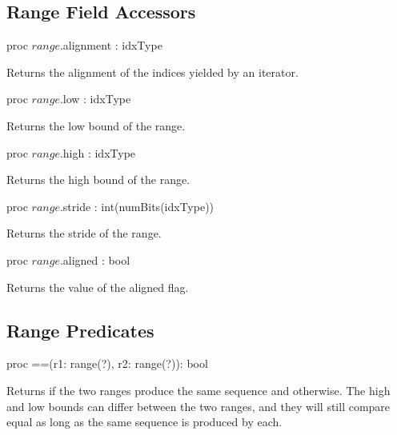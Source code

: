 \subsection{Range Field Accessors}
\label{Range_Field_Accessors}
\begin{protohead}
proc $range$.alignment : idxType
\end{protohead}
\begin{protobody}
Returns the alignment of the indices yielded by an iterator.  
\end{protobody}

\begin{protohead}
proc $range$.low : idxType
\end{protohead}
\begin{protobody}
Returns the low bound of the range.
\end{protobody}

\begin{protohead}
proc $range$.high : idxType
\end{protohead}
\begin{protobody}
Returns the high bound of the range.
\end{protobody}

\begin{protohead}
proc $range$.stride : int(numBits(idxType))
\end{protohead}
\begin{protobody}
Returns the stride of the range.  
\end{protobody}

\begin{protohead}
proc $range$.aligned : bool
\end{protohead}
\begin{protobody}
Returns the value of the aligned flag.
\end{protobody}

\subsection{Range Predicates}
\label{Range_Predicates}

\begin{protohead}
proc ==(r1: range(?), r2: range(?)): bool
\end{protohead}
\begin{protobody}
Returns  if the two ranges produce the same sequence
and  otherwise.  The high and low bounds can differ between the two
ranges, and they will still compare equal as long as the same sequence is
produced by each.
\end{protobody}

